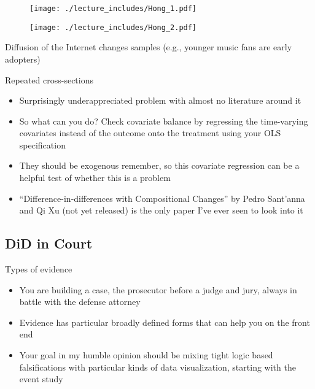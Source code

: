 \documentclass{beamer}
\begin{document}
\begin{frame}[plain]
	\begin{figure}
	\texttt{[image: ./lecture\_includes/Hong\_1.pdf]}
	\end{figure}
	
\end{frame}

\begin{frame}[shrink=20,plain]
	\begin{figure}
	\texttt{[image: ./lecture\_includes/Hong\_2.pdf]}
	\end{figure}
	
	Diffusion of the Internet changes samples (e.g., younger music fans are early adopters)
	
\end{frame}

\begin{frame}{Repeated cross-sections}

\begin{itemize}
\item Surprisingly underappreciated problem with almost no literature around it
\item So what can you do?  Check covariate balance by regressing the time-varying covariates instead of the outcome onto the treatment using your OLS specification
\item They should be exogenous remember, so this covariate regression can be a helpful test of whether this is a problem
\item ``Difference-in-differences with Compositional Changes'' by Pedro Sant'anna and Qi Xu (not yet released) is the only paper I've ever seen to look into it
\end{itemize}

\end{frame}


\subsection{DiD in Court}

\begin{frame}{Types of evidence}

\begin{itemize}
\item You are building a case, the prosecutor before a judge and jury, always in battle with the defense attorney
\item Evidence has particular broadly defined forms that can help you on the front end
\item Your goal in my humble opinion should be mixing tight logic based falsifications with particular kinds of data visualization, starting with the event study
\end{itemize}

\end{frame}
\end{document}

